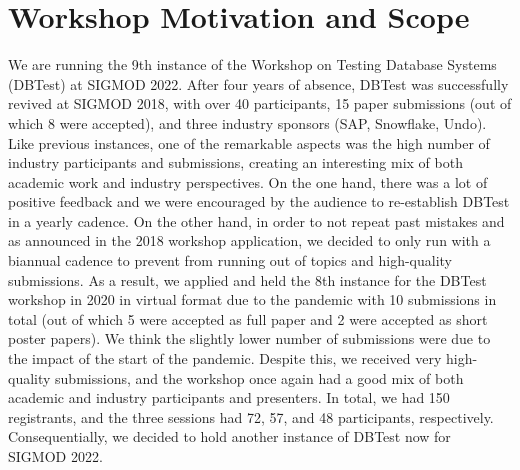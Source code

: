 \documentclass[sigconf]{acmart}
\begin{document}
\maketitle

\section{Workshop Motivation and Scope}
We are running the 9th instance of the Workshop on Testing Database Systems (DBTest) at SIGMOD 2022.
After four years of absence, DBTest was successfully revived at SIGMOD 2018, with over 40 participants, 15 paper submissions (out of which 8 were accepted), and three industry sponsors (SAP, Snowflake, Undo).
Like previous instances, one of the remarkable aspects was the high number of industry participants and submissions, creating an interesting mix of both academic work and industry perspectives.
On the one hand, there was a lot of positive feedback and we were encouraged by the audience to re-establish DBTest in a yearly cadence.
On the other hand, in order to not repeat past mistakes and as announced in the 2018 workshop application, we decided to only run with a biannual cadence to prevent from running out of topics and high-quality submissions.
As a result, we applied and held the 8th instance for the DBTest workshop in 2020 in virtual format due to the pandemic with 10 submissions in total (out of which 5 were accepted as full paper and 2 were accepted as short poster papers).
We think the slightly lower number of submissions were due to the impact of the start of the pandemic.
Despite this, we received very high-quality submissions, and the workshop once again had a good mix of both academic and industry participants and presenters. In total, we had 150 registrants, and the three sessions had 72, 57, and 48 participants, respectively.
Consequentially, we decided to hold another instance of DBTest now for SIGMOD 2022.
\end{document}

